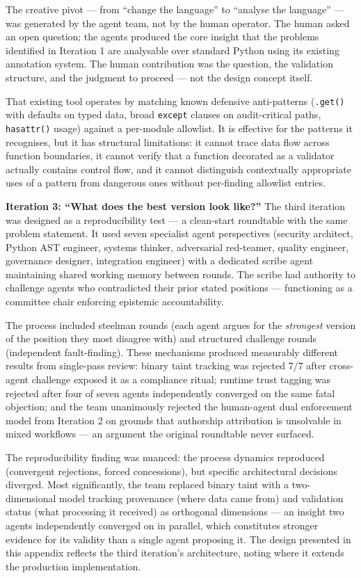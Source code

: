 \documentclass[a4paper,11pt]{report}
\begin{document}
The creative pivot --- from ``change the language'' to ``analyse the
language'' --- was generated by the agent team, not by the human
operator. The human asked an open question; the agents produced the core
insight that the problems identified in Iteration 1 are analysable over
standard Python using its existing annotation system. The human
contribution was the question, the validation structure, and the
judgment to proceed --- not the design concept itself.

That existing tool operates by matching known defensive anti-patterns
(\texttt{.get()} with defaults on typed data, broad \texttt{except}
clauses on audit-critical paths, \texttt{hasattr()} usage) against a
per-module allowlist. It is effective for the patterns it recognises,
but it has structural limitations: it cannot trace data flow across
function boundaries, it cannot verify that a function decorated as a
validator actually contains control flow, and it cannot distinguish
contextually appropriate uses of a pattern from dangerous ones without
per-finding allowlist entries.

\textbf{Iteration 3: ``What does the best version look like?''} The
third iteration was designed as a reproducibility test --- a clean-start
roundtable with the same problem statement. It used seven specialist
agent perspectives (security architect, Python AST engineer, systems
thinker, adversarial red-teamer, quality engineer, governance designer,
integration engineer) with a dedicated scribe agent maintaining shared
working memory between rounds. The scribe had authority to challenge
agents who contradicted their prior stated positions --- functioning as
a committee chair enforcing epistemic accountability.

The process included steelman rounds (each agent argues for the
\emph{strongest} version of the position they most disagree with) and
structured challenge rounds (independent fault-finding). These
mechanisms produced measurably different results from single-pass
review: binary taint tracking was rejected 7/7 after cross-agent
challenge exposed it as a compliance ritual; runtime trust tagging was
rejected after four of seven agents independently converged on the same
fatal objection; and the team unanimously rejected the human-agent dual
enforcement model from Iteration 2 on grounds that authorship
attribution is unsolvable in mixed workflows --- an argument the
original roundtable never surfaced.

The reproducibility finding was nuanced: the process dynamics reproduced
(convergent rejections, forced concessions), but specific architectural
decisions diverged. Most significantly, the team replaced binary taint
with a two-dimensional model tracking provenance (where data came from)
and validation status (what processing it received) as orthogonal
dimensions --- an insight two agents independently converged on in
parallel, which constitutes stronger evidence for its validity than a
single agent proposing it. The design presented in this appendix
reflects the third iteration's architecture, noting where it extends the
production implementation.
\end{document}
